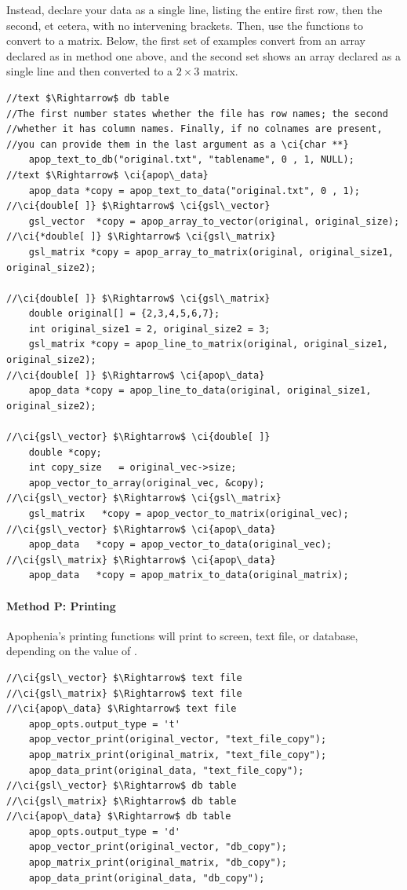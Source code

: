 Instead, declare your data as a single line, listing the entire first
row, then the second, et cetera, with no intervening brackets. Then, use
the  functions to convert to a matrix. Below, the
first set of examples convert from an array declared as in method one
above, and the second set shows an array declared as a single line and
then converted to a $2 \times 3$ matrix.
\begin{lstlisting}
//text $\Rightarrow$ db table
//The first number states whether the file has row names; the second
//whether it has column names. Finally, if no colnames are present,
//you can provide them in the last argument as a \ci{char **}
    apop_text_to_db("original.txt", "tablename", 0 , 1, NULL);
//text $\Rightarrow$ \ci{apop\_data}
    apop_data *copy = apop_text_to_data("original.txt", 0 , 1);
//\ci{double[ ]} $\Rightarrow$ \ci{gsl\_vector}
    gsl_vector  *copy = apop_array_to_vector(original, original_size);
//\ci{*double[ ]} $\Rightarrow$ \ci{gsl\_matrix}
    gsl_matrix *copy = apop_array_to_matrix(original, original_size1, original_size2);

//\ci{double[ ]} $\Rightarrow$ \ci{gsl\_matrix}
    double original[] = {2,3,4,5,6,7};
    int original_size1 = 2, original_size2 = 3;
    gsl_matrix *copy = apop_line_to_matrix(original, original_size1, original_size2);
//\ci{double[ ]} $\Rightarrow$ \ci{apop\_data}
    apop_data *copy = apop_line_to_data(original, original_size1, original_size2);

//\ci{gsl\_vector} $\Rightarrow$ \ci{double[ ]}
    double *copy;
    int copy_size   = original_vec->size;
    apop_vector_to_array(original_vec, &copy);
//\ci{gsl\_vector} $\Rightarrow$ \ci{gsl\_matrix}
    gsl_matrix   *copy = apop_vector_to_matrix(original_vec);
//\ci{gsl\_vector} $\Rightarrow$ \ci{apop\_data}
    apop_data   *copy = apop_vector_to_data(original_vec);
//\ci{gsl\_matrix} $\Rightarrow$ \ci{apop\_data}
    apop_data   *copy = apop_matrix_to_data(original_matrix);
\end{lstlisting}

\paragraph{Method P: Printing}
  
Apophenia's printing functions will print to screen, text file, or
database, depending on the value of .
\begin{lstlisting}
//\ci{gsl\_vector} $\Rightarrow$ text file
//\ci{gsl\_matrix} $\Rightarrow$ text file
//\ci{apop\_data} $\Rightarrow$ text file
    apop_opts.output_type = 't'
    apop_vector_print(original_vector, "text_file_copy");
    apop_matrix_print(original_matrix, "text_file_copy");
    apop_data_print(original_data, "text_file_copy");
//\ci{gsl\_vector} $\Rightarrow$ db table
//\ci{gsl\_matrix} $\Rightarrow$ db table
//\ci{apop\_data} $\Rightarrow$ db table
    apop_opts.output_type = 'd'
    apop_vector_print(original_vector, "db_copy");
    apop_matrix_print(original_matrix, "db_copy");
    apop_data_print(original_data, "db_copy");
\end{lstlisting}


